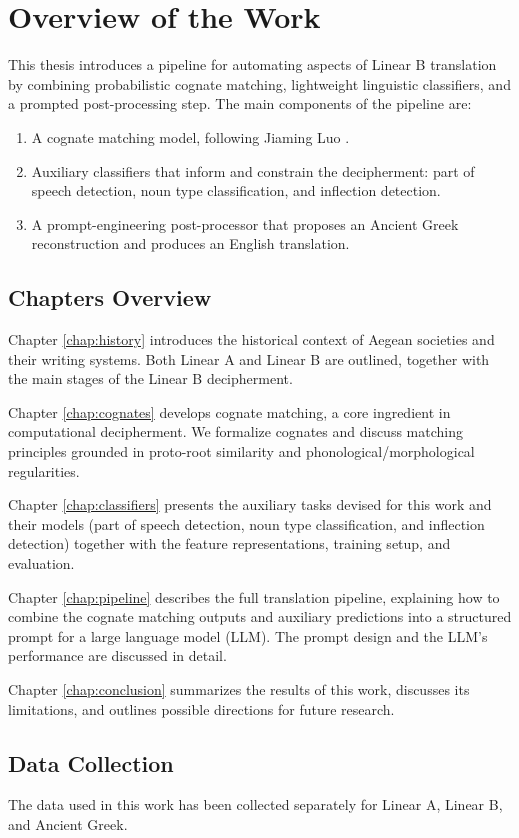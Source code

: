 \chapter{Overview of the Work}
This thesis introduces a pipeline for automating aspects of Linear B translation by combining probabilistic cognate matching, lightweight linguistic classifiers, and a prompted post-processing step.
The main components of the pipeline are:
\begin{enumerate}
    \item A cognate matching model, following Jiaming Luo \cite{luo}.
    \item Auxiliary classifiers that inform and constrain the decipherment: part of speech detection, noun type classification, and inflection detection.
    \item A prompt-engineering post-processor that proposes an Ancient Greek reconstruction and produces an English translation.
\end{enumerate}

\section{Chapters Overview}
Chapter \ref{chap:history} introduces the historical context of Aegean societies and their writing systems. Both Linear A and Linear B are outlined, together with the main stages of the Linear B decipherment.

Chapter \ref{chap:cognates} develops cognate matching, a core ingredient in computational decipherment. We formalize cognates and discuss matching principles grounded in proto-root similarity and phonological/morphological regularities.

Chapter \ref{chap:classifiers} presents the auxiliary tasks devised for this work and their models (part of speech detection, noun type classification, and inflection detection) together with the feature representations, training setup, and evaluation.

Chapter \ref{chap:pipeline} describes the full translation pipeline, explaining how to combine the cognate matching outputs and auxiliary predictions into a structured prompt for a large language model (LLM). The prompt design and the LLM's performance are discussed in detail.

Chapter \ref{chap:conclusion} summarizes the results of this work, discusses its limitations, and outlines possible directions for future research.

\section{Data Collection}
The data used in this work has been collected separately for Linear A, Linear B, and Ancient Greek.

